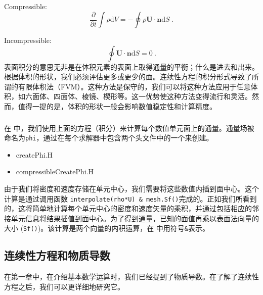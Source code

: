 \documentclass[LBMDerivation.tex]{subfiles}
\begin{document}
	Compressible:
%
%
\begin{equation}
 \boxed{
 \frac{\partial}{\partial t} \int \rho \mathrm{d}V=
 -   \oint \rho \textbf{U} \cdot \textbf{n} \mathrm{d}S
   } ~.
\end{equation}
%
%

	Incompressible:
%
%
\begin{equation}
 \boxed{
    \oint \textbf{U} \cdot \textbf{n} \mathrm{d}S = 0
   } ~.
\end{equation}
%
%
	表面积分的意思无非是在体积元素的表面上取得通量的平衡；什么是进去和出来。根据体积的形状，我们必须评估更多或更少的面。连续性方程的积分形式导致了所谓的有限体积法（FVM）。这种方法是保守的，我们可以将这种方法应用于任意体积，如六面体、四面体、棱镜、楔形等。这一优势使这种方法变得流行和灵活。然而，值得一提的是，体积的形状一般会影响数值稳定性和计算精度。
%
%
%
%
%
\subsubsection{\OF}
%
%
在 \OF 中，我们使用上面的方程（积分）来计算每个数值单元面上的通量。通量场被命名为\texttt{phi}，通过在每个求解器中包含两个头文件中的一个来创建。
%
%
\begin{itemize}
 \item createPhi.H
 \item compressibleCreatePhi.H
\end{itemize}
%
%

	由于我们将密度和速度存储在单元中心，我们需要将这些数值内插到面中心。这个计算是通过调用函数  \texttt{interpolate(rho*U) \& mesh.Sf()}完成的。正如我们所看到的，这将简单地计算每个单元中心的密度和速度矢量的乘积，并通过包括相应的邻接单元信息将结果插值到面中心。为了得到通量，已知的面值再乘以表面法向量的大小 (\texttt{Sf()})。该计算是两个向量的内积运算，在 \OF 中用符号\texttt{\&}表示。
%
%
%
%
%
\subsection{连续性方程和物质导数}
%
%
在第一章中，在介绍基本数学运算时，我们已经提到了物质导数。在了解了连续性方程之后，我们可以更详细地研究它。
\end{document}
